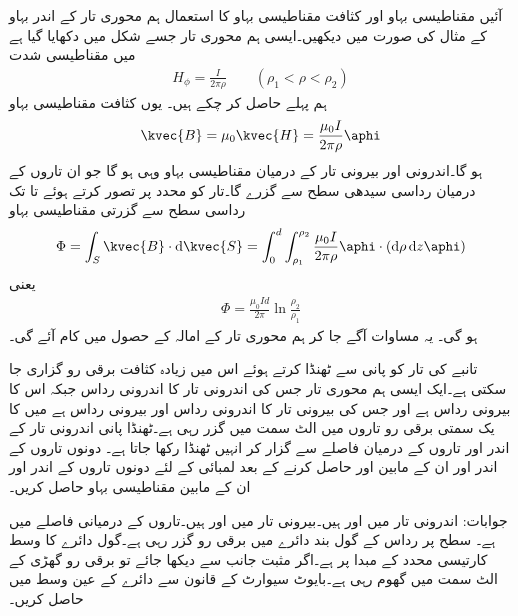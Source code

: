 آئیں مقناطیسی بہاو اور کثافت مقناطیسی بہاو کا استعمال ہم محوری تار کے اندر بہاو کے مثال کی صورت میں دیکھیں۔ایسی ہم محوری تار جسے شکل  میں دکھایا گیا ہے میں مقناطیسی شدت
\begin{align*}
H_{\phi}=\frac{I}{2\pi \rho} \quad \quad (\rho_1 < \rho < \rho_2)
\end{align*}
ہم پہلے حاصل کر چکے ہیں۔ یوں کثافت مقناطیسی بہاو
\begin{align*}
\kvec{B}=\mu_0 \kvec{H}=\frac{\mu_0 I}{2\pi \rho} \aphi
\end{align*}
ہو گا۔اندرونی اور بیرونی تار کے درمیان مقناطیسی بہاو وہی ہو گا جو ان تاروں کے درمیان رداسی سیدھی سطح سے گزرے گا۔تار کو  محدد پر تصور کرتے ہوئے  تا  تک رداسی سطح سے گزرتی مقناطیسی بہاو
\begin{align*}
\Phi=\int_S \kvec{B} \cdot \dif \kvec{S}=\int_{0}^{d} \int_{\rho_1}^{\rho_2} \frac{\mu_0 I}{2\pi \rho} \aphi \cdot (\dif \rho \dif z \aphi)
\end{align*}
یعنی
\begin{align}
\Phi=\frac{\mu_0 I d}{2\pi} \ln \frac{\rho_2}{\rho_1}
\end{align}
ہو گی۔ یہ مساوات آگے جا کر ہم محوری تار کے امالہ کے حصول میں کام آئے گی۔

تانبے کی تار کو پانی سے ٹھنڈا کرتے ہوئے اس میں زیادہ کثافت برقی رو گزاری جا سکتی ہے۔ایک ایسی ہم محوری تار جس کی اندرونی تار کا اندرونی رداس  جبکہ اس کا بیرونی رداس  ہے اور جس کی بیرونی تار کا اندرونی رداس  اور بیرونی رداس  ہے میں  کا یک سمتی برقی رو تاروں میں الٹ سمت میں گزر رہی ہے۔ٹھنڈا پانی اندرونی تار کے اندر اور تاروں کے درمیان فاصلے سے گزار کر انہیں ٹھنڈا رکھا جاتا ہے۔ دونوں تاروں کے اندر اور ان کے مابین  اور  حاصل کرنے کے بعد   لمبائی کے  لئے  دونوں تاروں کے اندر اور ان کے مابین  مقناطیسی بہاو حاصل کریں۔

جوابات: اندرونی تار میں  اور  ہیں۔بیرونی تار میں  اور  ہیں۔تاروں کے درمیانی فاصلے میں  ہے۔
 سطح پر  رداس کے گول بند دائرے میں  برقی رو گزر رہی ہے۔گول دائرے کا وسط کارتیسی محدد کے مبدا  پر ہے۔اگر مثبت  جانب  سے دیکھا جائے تو برقی رو گھڑی کے الٹ سمت میں گھوم رہی ہے۔بایوٹ سیوارٹ کے قانون سے دائرے کے عین وسط میں  حاصل کریں۔

